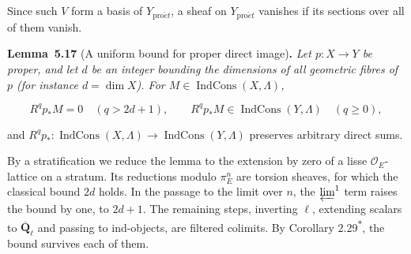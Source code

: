 \documentclass[11pt]{article}
\newenvironment{bpstatement}[2]{\par\addvspace{0.6\baselineskip}\noindent\textbf{#1}#2\textbf{.}\enspace\ignorespaces}
  {\par\addvspace{0.4\baselineskip}}
\newenvironment{bpstatementit}[2]{\begin{bpstatement}{#1}{#2}\itshape\ignorespaces}{\end{bpstatement}}
\newcommand{\bpout}[1]{#1\textsuperscript{\hyperlink{bp-outside}{\ensuremath{\ast}}}}
\providecommand{\IndCons}{}\renewcommand{\IndCons}{\operatorname{IndCons}}
\begin{document}
Since such \(V\) form a basis of \(Y_{\mathrm{pro}\acute{e}t}\), a sheaf on \(Y_{\mathrm{pro}\acute{e}t}\) vanishes if its sections over all of them vanish.

\label{bp57}%
\begin{bpstatementit}{Lemma~5.17}{ (A uniform bound for proper direct image)}
Let \(p:X\to Y\) be proper, and let \(d\) be an integer bounding the dimensions of all geometric fibres of \(p\) (for instance \(d=\dim X\)). For \(M\in\IndCons(X,\Lambda)\),

\[
R^qp_*M=0\quad(q>2d+1),\qquad R^qp_*M\in\IndCons(Y,\Lambda)\quad(q\geq0),
\]

and \(R^qp_*:\IndCons(X,\Lambda)\to\IndCons(Y,\Lambda)\) preserves arbitrary direct sums.
\end{bpstatementit}

\label{bp58}%
By a stratification we reduce the lemma to the extension by zero of a lisse \(\mathcal O_E\)-lattice on a stratum. Its reductions modulo \(\pi_E^n\) are torsion sheaves, for which the classical bound \(2d\) holds. In the passage to the limit over \(n\), the \(\varprojlim^1\) term raises the bound by one, to \(2d+1\). The remaining steps, inverting \(\ell\), extending scalars to \(\overline{\mathbf Q}_\ell\) and passing to ind-objects, are filtered colimits. By Corollary \bpout{2.29}, the bound survives each of them.
\end{document}
